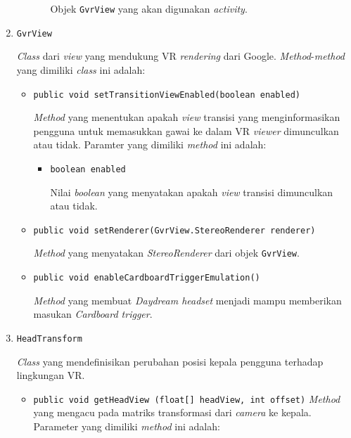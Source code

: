 \begin{enumerate}
\begin{itemize}
\begin{itemize}
					Objek \texttt{GvrView} yang akan digunakan \textit{activity}.
				\end{itemize}			
			\end{itemize}	 
		
		\item \texttt{GvrView}
		
		\textit{Class} dari \textit{view} yang mendukung VR \textit{rendering} dari Google. \textit{Method}-\textit{method} yang dimiliki \textit{class} ini adalah:
		
		\begin{itemize}			
			\item \texttt{public void  setTransitionViewEnabled(boolean enabled)}
			
			\textit{Method} yang menentukan apakah \textit{view} transisi yang menginformasikan pengguna untuk memasukkan gawai ke dalam VR \textit{viewer} dimunculkan atau tidak. Paramter yang dimiliki \textit{method} ini adalah:
			
			\begin{itemize}
				\item \texttt{boolean enabled}
				
				Nilai \textit{boolean} yang menyatakan apakah \textit{view} transisi dimunculkan atau tidak. 
			\end{itemize}
			
			\item \texttt{public void setRenderer(GvrView.StereoRenderer renderer)}
			
			\textit{Method} yang menyatakan \textit{StereoRenderer} dari objek \texttt{GvrView}.
			
			\item \texttt{public void enableCardboardTriggerEmulation()}
			
			\textit{Method} yang membuat \textit{Daydream headset} menjadi mampu memberikan masukan \textit{Cardboard trigger}.
			
		\end{itemize}
			
		\item \texttt{HeadTransform}
		
		\textit{Class} yang mendefinisikan perubahan posisi kepala pengguna terhadap lingkungan VR.
		
		\begin{itemize}
			\item \texttt{public void getHeadView (float[] headView, int offset)}
			\textit{Method} yang mengacu pada matriks transformasi dari \textit{camera} ke kepala. Parameter yang dimiliki \textit{method} ini adalah:			
			

\end{itemize}
\end{enumerate}
